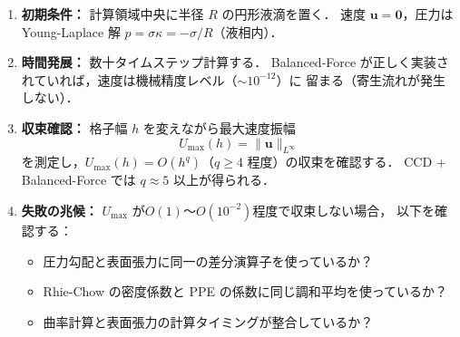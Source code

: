 \begin{tcolorbox}[algbox, title={静止液滴テスト：Balanced-Force の検証手順}]
\begin{enumerate}
  \item \textbf{初期条件：} 計算領域中央に半径 $R$ の円形液滴を置く．
        速度 $\bm{u} = \bm{0}$，圧力は Young-Laplace 解 $p = \sigma\kappa = -\sigma/R$（液相内）．

  \item \textbf{時間発展：} 数十タイムステップ計算する．
        Balanced-Force が正しく実装されていれば，速度は機械精度レベル（$\sim 10^{-12}$）に
        留まる（寄生流れが発生しない）．

  \item \textbf{収束確認：} 格子幅 $h$ を変えながら最大速度振幅
        \[
          U_{\mathrm{max}}(h) = \|\bm{u}\|_{L^\infty}
        \]
        を測定し，$U_{\mathrm{max}}(h) = O(h^q)$（$q \ge 4$ 程度）の収束を確認する．
        CCD + Balanced-Force では $q \approx 5$ 以上が得られる．

  \item \textbf{失敗の兆候：} $U_{\mathrm{max}}$ が$O(1)$〜$O(10^{-2})$程度で収束しない場合，
        以下を確認する：
        \begin{itemize}
          \item 圧力勾配と表面張力に同一の差分演算子を使っているか？
          \item Rhie-Chow の密度係数と PPE の係数に同じ調和平均を使っているか？
          \item 曲率計算と表面張力の計算タイミングが整合しているか？
        \end{itemize}
\end{enumerate}
\end{tcolorbox}
